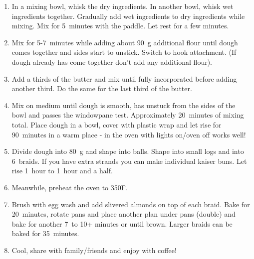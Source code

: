 \begin{enumerate}
    \item In a mixing bowl, whisk the dry ingredients. In another bowl, whisk wet ingredients together. Gradually add wet ingredients to dry ingredients while mixing. Mix for 5~minutes with the paddle. Let rest for a few minutes.
    \item Mix for 5-7~minutes while adding about 90~g additional flour until dough comes together and sides start to unstick. Switch to hook attachment. (If dough already has come together don't add any additional flour).
    \item Add a thirds of the butter and mix until fully incorporated before adding another third. Do the same for the last third of the butter.
    \item Mix on medium until dough is smooth, has unstuck from the sides of the bowl and passes the windowpane test. Approximately 20~minutes of mixing total. Place dough in a bowl, cover with plastic wrap and let rise for 90~minutes in a warm place - in the oven with lights on/oven off works well!
    \item Divide dough into 80~g and shape into balls. Shape into small logs and into 6~braids. If you have extra strands you can make individual kaiser buns. Let rise 1~hour to 1~hour and a half.
    \item Meanwhile, preheat the oven to 350\degree F.
    \item Brush with egg wash and add slivered almonds on top of each braid. Bake for 20~minutes, rotate pans and place another plan under pans (double) and bake for another 7~to 10+ minutes or until brown. Larger braids can be baked for 35~minutes.
    \item Cool, share with family/friends and enjoy with coffee!
\end{enumerate}


